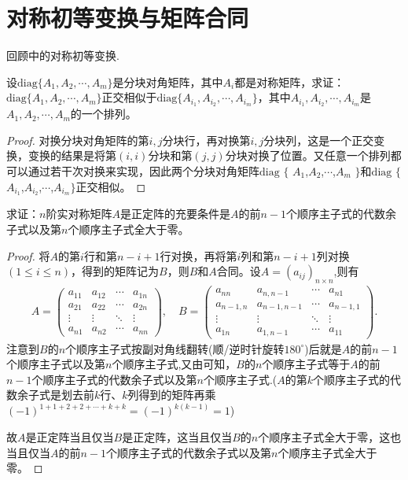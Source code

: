\documentclass[../../main.tex]{subfiles}
\begin{document}
\section{对称初等变换与矩阵合同}

回顾中的对称初等变换.

\begin{proposition}\label{proposition:分块对称准对角阵正交相似于其任意排列}
设\(\mathrm{diag}\{A_1,A_2,\cdots,A_m\}\)是分块对角矩阵，其中\(A_i\)都是对称矩阵，求证：\(\mathrm{diag}\{A_1,A_2,\cdots,A_m\}\)正交相似于\(\mathrm{diag}\{A_{i_1},A_{i_2},\cdots,A_{i_m}\}\)，其中\(A_{i_1},A_{i_2},\cdots,A_{i_m}\)是\(A_1,A_2,\cdots,A_m\)的一个排列。
\end{proposition}
\begin{proof}
对换分块对角矩阵的第\(i,j\)分块行，再对换第\(i,j\)分块列，这是一个正交变换，变换的结果是将第\((i,i)\)分块和第\((j,j)\)分块对换了位置。又任意一个排列都可以通过若干次对换来实现，因此两个分块对角矩阵$\mathrm{diag}$ $\{$ $A_1$,$A_2$,$\cdots$,$A_m$ $\}$和$\mathrm{diag}$ $\{$ $A_{i_1}$,$A_{i_2}$,$\cdots$,$A_{i_m}\}$正交相似。

\end{proof}

\begin{proposition}
求证：\(n\)阶实对称矩阵\(A\)是正定阵的充要条件是\(A\)的前\(n - 1\)个顺序主子式的代数余子式以及第\(n\)个顺序主子式全大于零。
\end{proposition}
\begin{proof}
将\(A\)的第\(i\)行和第\(n - i + 1\)行对换，再将第\(i\)列和第\(n - i + 1\)列对换\((1\leqslant  i\leqslant  n)\)，得到的矩阵记为\(B\)，则\(B\)和\(A\)合同。设$A=(a_{ij})_{n\times n}$,则有
\begin{align*}
A=
\begin{pmatrix}
a_{11} & a_{12} & \cdots & a_{1n} \\
a_{21} & a_{22} & \cdots & a_{2n} \\
\vdots & \vdots & \ddots & \vdots \\
a_{n1} & a_{n2} & \cdots & a_{nn}
\end{pmatrix},\quad
B=
\begin{pmatrix}
a_{nn} & a_{n,n-1} & \cdots & a_{n1} \\
a_{n-1,n} & a_{n-1,n-1} & \cdots & a_{n-1,1} \\
\vdots & \vdots & \ddots & \vdots \\
a_{1n} & a_{1,n-1} & \cdots & a_{11}
\end{pmatrix}.
\end{align*}
注意到\(B\)的\(n\)个顺序主子式按副对角线翻转(顺/逆时针旋转$180^{\circ}$)后就是\(A\)的前\(n - 1\)个顺序主子式以及第\(n\)个顺序主子式,又由可知，\(B\)的\(n\)个顺序主子式等于\(A\)的前\(n - 1\)个顺序主子式的代数余子式以及第\(n\)个顺序主子式.($A$的第$k$个顺序主子式的代数余子式是划去前$k$行、$k$列得到的矩阵再乘$(-1)^{1+1+2+2+\cdots+k+k}=(-1)^{k(k-1)}=1$)

故\(A\)是正定阵当且仅当\(B\)是正定阵，这当且仅当\(B\)的\(n\)个顺序主子式全大于零，这也当且仅当\(A\)的前\(n - 1\)个顺序主子式的代数余子式以及第\(n\)个顺序主子式全大于零。

\end{proof}
\end{document}
